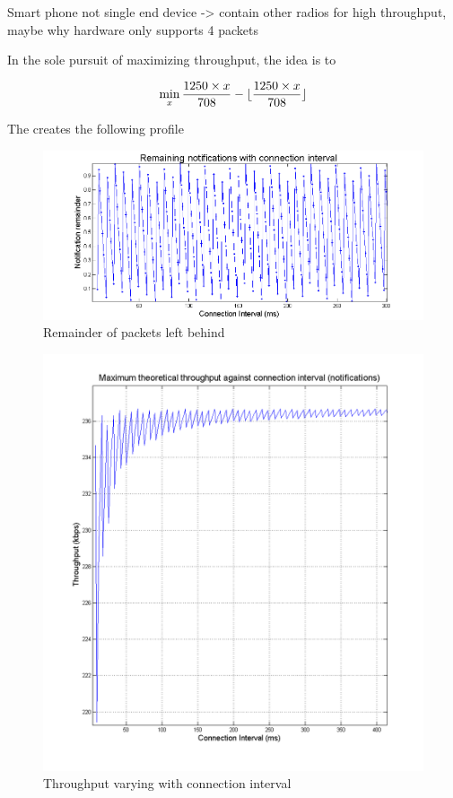 \documentclass[]{article}
\DeclarePairedDelimiter\floor{\lfloor}{\rfloor}
\begin{document}
Smart phone not single end device -> contain other radios for high throughput, maybe why hardware only supports 4 packets

In the sole pursuit of maximizing throughput, the idea is to 

\begin{displaymath}
\min_{x}  \frac{1250\times x}{708} - \floor{ \frac{1250\times x}{708}} 
\end{displaymath}

The creates the following profile

\begin{figure}[htb]
	\begin{center}
		\includegraphics[width = \textwidth]{notremain}
	\end{center}
	\caption{Remainder of packets left behind}
	\label{fig:notremain}
\end{figure}

\begin{figure}[htb]
	\begin{center}
		\includegraphics[width = 1.1\textwidth]{throughput}
	\end{center}
	\caption{Throughput varying with connection interval}
	\label{fig:throughput}
\end{figure}
\end{document}
